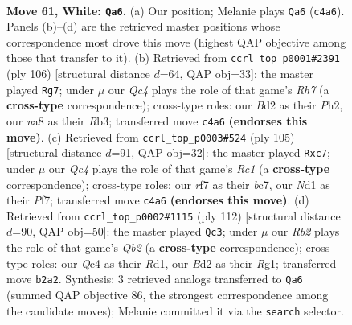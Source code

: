 \documentclass[11pt]{article}
\begin{document}
\clearpage

\begin{figure}[p]\centering
\begin{subfigure}{0.46\textwidth}\centering
\resizebox{\linewidth}{!}{%
\newchessgame
\chessboard[
  setfen={n7/1r1qbrk1/8/P1p2p1p/2Qp1Pp1/8/1RRBP2P/3N2K1 w - - 4 61},
  showmover=false,
  pgfstyle=straightmove, color=movearrow, markmove={c4-a6}
]}
\caption{}
\end{subfigure}\hfill
\begin{subfigure}{0.46\textwidth}\centering
\resizebox{\linewidth}{!}{%
\newchessgame
\chessboard[
  setfen={k1q1r3/1pb4R/p1r4p/2P3p1/PQ2p3/1R2B3/KP5P/8 w - - 8 54},
  showmover=false,
  pgfstyle=straightmove, color=movearrow, markmove={h7-g7}
]}
\caption{}
\end{subfigure}
\\[4pt]
\begin{subfigure}{0.46\textwidth}\centering
\resizebox{\linewidth}{!}{%
\newchessgame
\chessboard[
  setfen={2r1r1k1/2B2p2/6p1/2p4p/2R1P3/4qP1P/1bQ3P1/3R3K b - - 1 53},
  showmover=false,
  pgfstyle=straightmove, color=movearrow, markmove={c8-c7}
]}
\caption{}
\end{subfigure}\hfill
\begin{subfigure}{0.46\textwidth}\centering
\resizebox{\linewidth}{!}{%
\newchessgame
\chessboard[
  setfen={1r3q1k/7b/p3rn1p/P1pN1p2/5P2/4p2P/1Q2B3/3R2RK w - - 3 57},
  showmover=false,
  pgfstyle=straightmove, color=movearrow, markmove={b2-c3}
]}
\caption{}
\end{subfigure}
\caption{\textbf{Move 61, White: \texttt{Qa6}.} (a) Our position; Melanie plays \texttt{Qa6} (\texttt{c4a6}). Panels (b)--(d) are the retrieved master positions whose correspondence most drove this move (highest QAP objective among those that transfer to it). (b) Retrieved from \texttt{ccrl\_top\_p0001\#2391} (ply 106) [structural distance $d$=64, QAP obj=33]: the master played \texttt{Rg7}; under $\mu$ our \emph{Qc4} plays the role of that game's \emph{Rh7} (a \textbf{cross-type} correspondence); cross-type roles: our \emph{B}d2 as their \emph{P}h2, our \emph{n}a8 as their \emph{R}b3; transferred move \texttt{c4a6} \textbf{(endorses this move)}. (c) Retrieved from \texttt{ccrl\_top\_p0003\#524} (ply 105) [structural distance $d$=91, QAP obj=32]: the master played \texttt{Rxc7}; under $\mu$ our \emph{Qc4} plays the role of that game's \emph{Rc1} (a \textbf{cross-type} correspondence); cross-type roles: our \emph{r}f7 as their \emph{b}c7, our \emph{N}d1 as their \emph{P}f7; transferred move \texttt{c4a6} \textbf{(endorses this move)}. (d) Retrieved from \texttt{ccrl\_top\_p0002\#1115} (ply 112) [structural distance $d$=90, QAP obj=50]: the master played \texttt{Qc3}; under $\mu$ our \emph{Rb2} plays the role of that game's \emph{Qb2} (a \textbf{cross-type} correspondence); cross-type roles: our \emph{Q}c4 as their \emph{R}d1, our \emph{B}d2 as their \emph{R}g1; transferred move \texttt{b2a2}. Synthesis: 3 retrieved analogs transferred to \texttt{Qa6} (summed QAP objective 86, the strongest correspondence among the candidate moves); Melanie committed it via the \texttt{search} selector.}
\label{fig:thought-m120}
\end{figure}
\end{document}
